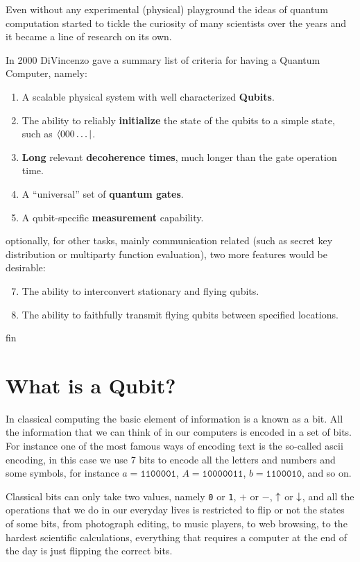 Even without any experimental (physical) playground the ideas of quantum computation started to tickle the curiosity of many scientists over the years and it became a line of research on its own. %

In 2000 DiVincenzo gave a summary list of criteria for having a Quantum Computer\cite{DiVincenzo2000}, namely:
\begin{enumerate}
  \item A scalable physical system with well characterized \textbf{Qubits}.
  \item The ability to reliably \textbf{initialize} the state of the qubits to a simple state, such as $\langle000\dots|$.
  \item \textbf{Long} relevant \textbf{decoherence times}, much longer than the gate operation time.
  \item A ``universal'' set of \textbf{quantum gates}.
  \item A qubit-specific \textbf{measurement} capability.
\end{enumerate}
optionally, for other tasks, mainly communication related (such as secret key distribution or multiparty function evaluation)\cite{DiVincenzo1999}, two more features would be desirable:
\begin{enumerate}
  \setcounter{enumi}{6}
  \item The ability to interconvert stationary and flying qubits\cite{Turchette1995,Imamoglu1999}.
  \item The ability to faithfully transmit flying qubits between specified locations.
\end{enumerate}

fin
\section{What is a Qubit?}
In classical computing the basic element of information is a known as a bit. All the information that we can think of in our computers is encoded in a set of bits.
For instance one of the most famous ways of encoding text is the so-called \ac{ascii} encoding, in this case we use 7 bits to encode all the letters and numbers and some symbols, for instance $a=\texttt{1100001}$, $A=\texttt{10000011}$, $b=\texttt{1100010}$, and so on.

Classical bits can only take two values, namely \texttt{0} or \texttt{1}, $+$ or $-$, $\uparrow$ or $\downarrow$, and all the operations that we do in our everyday lives is restricted to flip or not the states of some bits, from photograph editing, to music players, to web browsing, to the hardest scientific calculations, everything that requires a computer at the end of the day is just flipping the correct bits.

